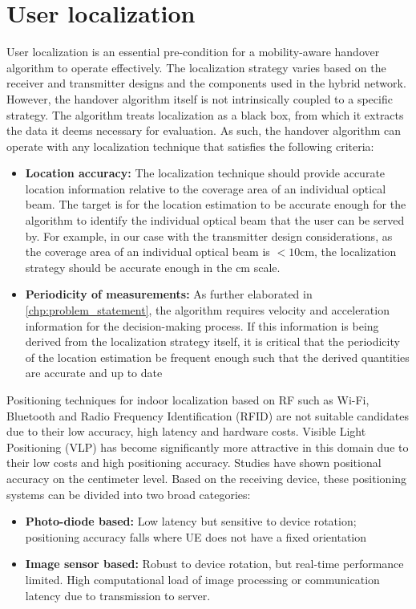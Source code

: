 \section{User localization}
\label{sec:mod-user-loc}
User localization is an essential pre-condition for a mobility-aware handover algorithm to operate effectively. The localization strategy varies based on the receiver and transmitter designs and the components used in the hybrid network. However, the handover algorithm itself is not intrinsically coupled to a specific strategy. The algorithm treats localization as a black box, from which it extracts the data it deems necessary for evaluation. As such, the handover algorithm can operate with any localization technique that satisfies the following criteria:
\begin{itemize}
    \item \textbf{Location accuracy:} The localization technique should provide accurate location information relative to the coverage area of an individual optical beam. The target is for the location estimation to be accurate enough for the algorithm to identify the individual optical beam that the user can be served by. For example, in our case with the transmitter design considerations, as the coverage area of an individual optical beam is $< 10 \text{cm}$, the localization strategy should be accurate enough in the cm scale.
    \item \textbf{Periodicity of measurements:} As further elaborated in \ref{chp:problem_statement}, the algorithm requires velocity and acceleration information for the decision-making process. If this information is being derived from the localization strategy itself, it is critical that the periodicity of the location estimation be frequent enough such that the derived quantities are accurate and up to date
\end{itemize}
Positioning techniques for indoor localization based on RF such as Wi-Fi, Bluetooth and Radio Frequency Identification (RFID) are not suitable candidates due to their low accuracy, high latency and hardware costs\cite{lin_real-time_2020}. Visible Light Positioning (VLP) has become significantly more attractive in this domain due to their low costs and high positioning accuracy. Studies have shown positional accuracy on the centimeter level\cite{hassan_indoor_2015}\cite{xu_experimental_2018}. Based on the receiving device, these positioning systems can be divided into two broad categories:
\begin{itemize}
    \item \textbf{Photo-diode based:} Low latency but sensitive to device rotation; positioning accuracy falls where UE does not have a fixed orientation
    \item \textbf{Image sensor based:} Robust to device rotation, but real-time performance limited. High computational load of image processing or communication latency due to transmission to server.
\end{itemize}
